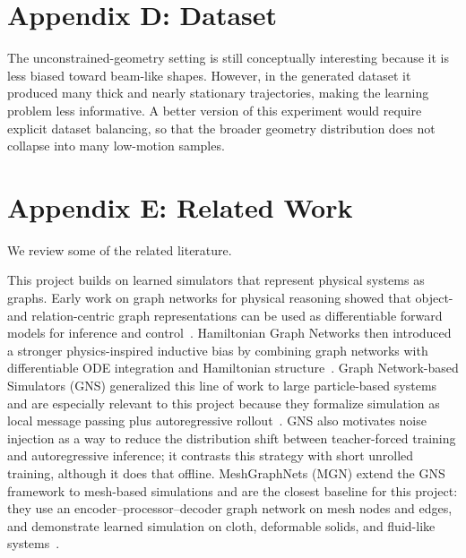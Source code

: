 \documentclass[11pt,a4paper,reqno]{amsart}
\theoremstyle{definition}
\theoremstyle{remark}
\numberwithin{equation}{section}
\begin{document}
\section*{Appendix D: Dataset}

The unconstrained-geometry setting is still conceptually interesting because it is less biased toward beam-like shapes. However, in the generated dataset it produced many thick and nearly stationary trajectories, making the learning problem less informative. A better version of this experiment would require explicit dataset balancing, so that the broader geometry distribution does not collapse into many low-motion samples.

\section*{Appendix E: Related Work}\label{app:related-work}

\noindent
We review some of the related literature.

This project builds on learned simulators that represent physical systems as graphs. Early work on graph networks for physical reasoning showed that object- and relation-centric graph representations can be used as differentiable forward models for inference and control~\cite{learnable_physics_engines}. Hamiltonian Graph Networks then introduced a stronger physics-inspired inductive bias by combining graph networks with differentiable ODE integration and Hamiltonian structure~\cite{hamiltonian_graph_networks}. Graph Network-based Simulators (GNS) generalized this line of work to large particle-based systems and are especially relevant to this project because they formalize simulation as local message passing plus autoregressive rollout~\cite{gns}. GNS also motivates noise injection as a way to reduce the distribution shift between teacher-forced training and autoregressive inference; it contrasts this strategy with short unrolled training, although it does that offline. 
MeshGraphNets (MGN) extend the GNS framework to mesh-based simulations and are the closest baseline for this project: they use an encoder--processor--decoder graph network on mesh nodes and edges, and demonstrate learned simulation on cloth, deformable solids, and fluid-like systems~\cite{mgn}.
\end{document}
